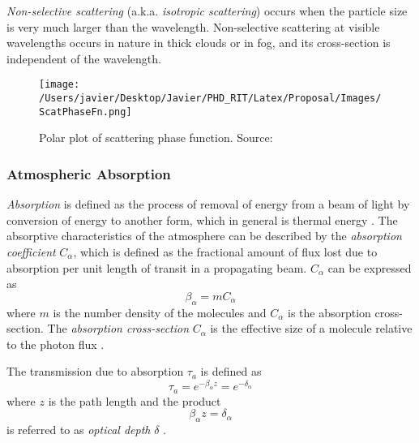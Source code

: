 {\it Non-selective scattering} (a.k.a. {\it isotropic scattering}) occurs when the particle size is very much larger than the wavelength. Non-selective scattering at visible wavelengths occurs in nature in thick clouds or in fog, and its cross-section is independent of the wavelength. 

\begin{figure}[htb]
  \centering
      \texttt{[image: /Users/javier/Desktop/Javier/PHD\_RIT/Latex/Proposal/Images/ScatPhaseFn.png]}
  \caption{Polar plot of scattering phase function. Source: \cite{Schott}}
  \label{fig:ScatPhFn}
\end{figure}

\subsubsection*{Atmospheric Absorption}
{\it Absorption} is defined as the process of removal of energy from a beam of light by conversion of energy to another form, which in general is thermal energy \cite{Schott}. The absorptive characteristics of the atmosphere can be described by the {\it absorption coefficient} $C_\alpha$, which is defined as the fractional amount of flux lost due to absorption per unit length of transit in a propagating beam. $C_\alpha$ can be expressed as
\begin{equation}
  \beta_\alpha = mC_\alpha
\end{equation}
where $m$ is the number density of the molecules and $C_\alpha$ is the absorption cross-section. The {\it absorption cross-section} $C_\alpha$ is the effective size of a molecule relative to the photon flux \cite{Schott}.

The transmission due to absorption $\tau_a$ is defined as
\begin{equation}
  \tau_a = e^{-\beta_\alpha z} = e^{-\delta_\alpha}
\end{equation}
where $z$ is the path length and the product 
\begin{equation}
  \beta_\alpha z=\delta_\alpha
\end{equation}
is referred to as {\it optical depth} $\delta$ \cite{Schott}.

